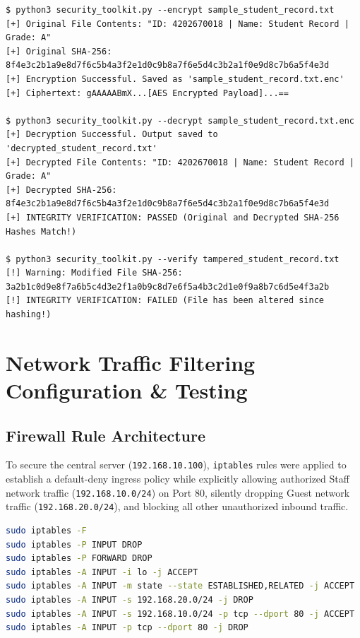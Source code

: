 \documentclass[11pt,a4paper]{article}
\begin{document}
\begin{lstlisting}
$ python3 security_toolkit.py --encrypt sample_student_record.txt
[+] Original File Contents: "ID: 4202670018 | Name: Student Record | Grade: A"
[+] Original SHA-256: 8f4e3c2b1a9e8d7f6c5b4a3f2e1d0c9b8a7f6e5d4c3b2a1f0e9d8c7b6a5f4e3d
[+] Encryption Successful. Saved as 'sample_student_record.txt.enc'
[+] Ciphertext: gAAAAABmX...[AES Encrypted Payload]...==

$ python3 security_toolkit.py --decrypt sample_student_record.txt.enc
[+] Decryption Successful. Output saved to 'decrypted_student_record.txt'
[+] Decrypted File Contents: "ID: 4202670018 | Name: Student Record | Grade: A"
[+] Decrypted SHA-256: 8f4e3c2b1a9e8d7f6c5b4a3f2e1d0c9b8a7f6e5d4c3b2a1f0e9d8c7b6a5f4e3d
[+] INTEGRITY VERIFICATION: PASSED (Original and Decrypted SHA-256 Hashes Match!)

$ python3 security_toolkit.py --verify tampered_student_record.txt
[!] Warning: Modified File SHA-256: 3a2b1c0d9e8f7a6b5c4d3e2f1a0b9c8d7e6f5a4b3c2d1e0f9a8b7c6d5e4f3a2b
[!] INTEGRITY VERIFICATION: FAILED (File has been altered since hashing!)
\end{lstlisting}


\section{Network Traffic Filtering Configuration \& Testing}

\subsection{Firewall Rule Architecture}
To secure the central server (\texttt{192.168.10.100}), \texttt{iptables} rules were applied to establish a default-deny ingress policy while explicitly allowing authorized Staff network traffic (\texttt{192.168.10.0/24}) on Port 80, silently dropping Guest network traffic (\texttt{192.168.20.0/24}), and blocking all other unauthorized inbound traffic.

\begin{lstlisting}[language=bash]
sudo iptables -F
sudo iptables -P INPUT DROP
sudo iptables -P FORWARD DROP
sudo iptables -A INPUT -i lo -j ACCEPT
sudo iptables -A INPUT -m state --state ESTABLISHED,RELATED -j ACCEPT
sudo iptables -A INPUT -s 192.168.20.0/24 -j DROP
sudo iptables -A INPUT -s 192.168.10.0/24 -p tcp --dport 80 -j ACCEPT
sudo iptables -A INPUT -p tcp --dport 80 -j DROP
\end{lstlisting}
\end{document}
